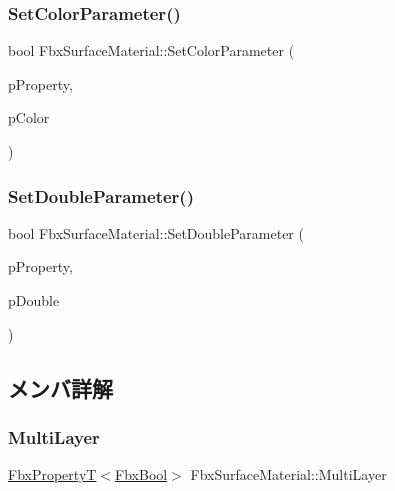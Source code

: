 \subsubsection{\texorpdfstring{Set\+Color\+Parameter()}{SetColorParameter()}}
{\footnotesize\ttfamily bool Fbx\+Surface\+Material\+::\+Set\+Color\+Parameter (\begin{DoxyParamCaption}\item[{\hyperlink{class_fbx_property}{Fbx\+Property}}]{p\+Property,  }\item[{\hyperlink{class_fbx_color}{Fbx\+Color} const \&}]{p\+Color }\end{DoxyParamCaption})\hspace{0.3cm}{\ttfamily [protected]}}

\mbox{\label{class_fbx_surface_material_a5d2b4164f67106f295a456f68b6d3bf2}} 
\subsubsection{\texorpdfstring{Set\+Double\+Parameter()}{SetDoubleParameter()}}
{\footnotesize\ttfamily bool Fbx\+Surface\+Material\+::\+Set\+Double\+Parameter (\begin{DoxyParamCaption}\item[{\hyperlink{class_fbx_property}{Fbx\+Property}}]{p\+Property,  }\item[{double}]{p\+Double }\end{DoxyParamCaption})\hspace{0.3cm}{\ttfamily [protected]}}



\subsection{メンバ詳解}
\mbox{\label{class_fbx_surface_material_ad62451d6f09f73c151a9f43f9349cd31}} 
\subsubsection{\texorpdfstring{Multi\+Layer}{MultiLayer}}
{\footnotesize\ttfamily \hyperlink{class_fbx_property_t}{Fbx\+PropertyT}$<$\hyperlink{fbxtypes_8h_a92e0562b2fe33e76a242f498b362262e}{Fbx\+Bool}$>$ Fbx\+Surface\+Material\+::\+Multi\+Layer}

